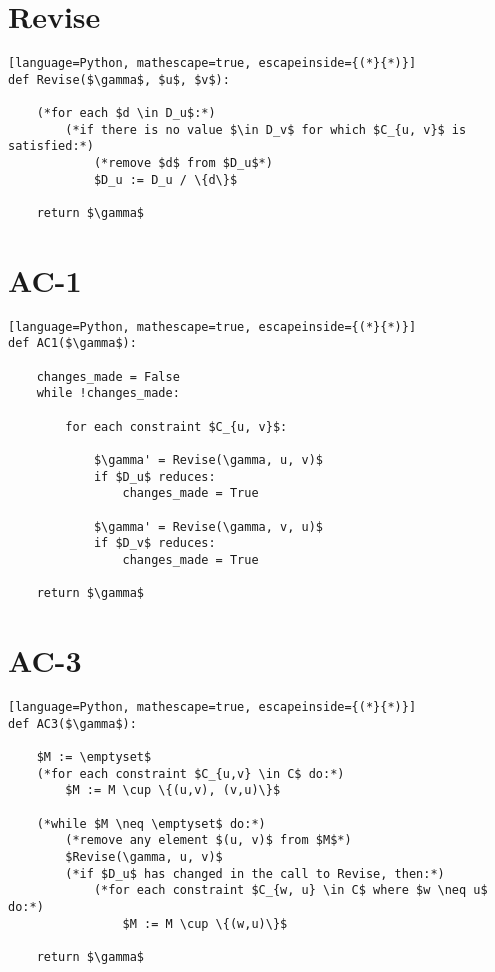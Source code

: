 \documentclass{article}
\begin{document}
\section*{Revise}
\begin{lstlisting}[language=Python, mathescape=true, escapeinside={(*}{*)}]
def Revise($\gamma$, $u$, $v$):

    (*for each $d \in D_u$:*)
        (*if there is no value $\in D_v$ for which $C_{u, v}$ is satisfied:*)
            (*remove $d$ from $D_u$*)
            $D_u := D_u / \{d\}$

    return $\gamma$

\end{lstlisting}

\section*{AC-1}
\begin{lstlisting}[language=Python, mathescape=true, escapeinside={(*}{*)}]
def AC1($\gamma$):

    changes_made = False
    while !changes_made:

        for each constraint $C_{u, v}$:
        
            $\gamma' = Revise(\gamma, u, v)$
            if $D_u$ reduces:
                changes_made = True
            
            $\gamma' = Revise(\gamma, v, u)$
            if $D_v$ reduces:
                changes_made = True

    return $\gamma$

\end{lstlisting}

\section*{AC-3}
\begin{lstlisting}[language=Python, mathescape=true, escapeinside={(*}{*)}]
def AC3($\gamma$):

    $M := \emptyset$
    (*for each constraint $C_{u,v} \in C$ do:*)
        $M := M \cup \{(u,v), (v,u)\}$

    (*while $M \neq \emptyset$ do:*)
        (*remove any element $(u, v)$ from $M$*)
        $Revise(\gamma, u, v)$
        (*if $D_u$ has changed in the call to Revise, then:*)
            (*for each constraint $C_{w, u} \in C$ where $w \neq u$ do:*)
                $M := M \cup \{(w,u)\}$

    return $\gamma$

\end{lstlisting}
\end{document}
